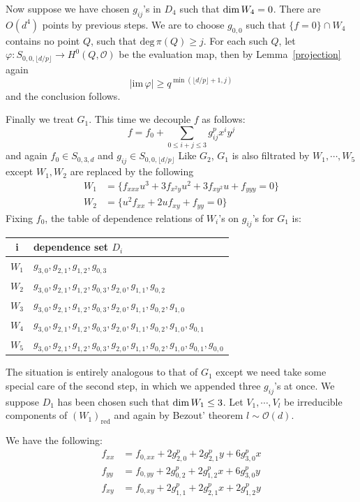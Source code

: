 \documentclass[12pt]{article}
\theoremstyle{plain}
\theoremstyle{definition}
\newcommand{\sO}{\mathcal{O}}
\renewcommand{\deg}{\mathrm{deg}\,}
\renewcommand\dim{{\rm dim\,}}
\newcommand{\<}{\langle}
\renewcommand{\>}{\rangle}
\newcommand{\fl}[1]{\lfloor #1 \rfloor}
\newcommand{\im}{\mathrm{im}\,}
\begin{document}
Now suppose we have chosen $g_{ij}$'s in $D_4$ such that $\dim W_4 = 0$. There are $O(d^4)$ points by previous steps. We are to choose $g_{0, 0}$ such that $\{f=0 \} \cap W_4$ contains no point $Q$, such that $\deg \pi({Q}) \ge j$. For each such $Q$, let $\varphi : S_{0, 0, \fl{d/p}} \to H^0(Q, \sO)$ be the evaluation map, then by Lemma~\ref{projection} again 
$$ |\im \varphi| \ge q^{\min(\fl{d/p} + 1, j)} $$
and the conclusion follows. 

Finally we treat $G_1$. This time we decouple $f$ as follows:
$$ f = f_0 + \sum_{0 \le i + j \le 3} g_{ij}^p x^i y^j $$
and again $f_0 \in S_{0, 3, d}$ and $g_{ij} \in S_{0, 0, \fl{d/p}}$
Like $G_2$, $G_1$ is also filtrated by $W_1, \cdots, W_5$ except $W_1, W_2$ are replaced by the following 
\begin{align*}
W_1 &= \{f_{xxx} u^3 + 3 f_{x^2 y} u^2 + 3 f_{x y^2} u + f_{yyy} = 0\}\\
W_2 &= \{u^2 f_{xx} + 2u f_{xy} + f_{yy} = 0\}
\end{align*}
Fixing $f_0$, the table of dependence relations of $W_i$'s on $g_{ij}$'s for $G_1$ is:
\begin{center}
\begin{tabular}{|c | l |}
\hline
i & dependence set $D_i$ \\ \hline
$W_1$ & $g_{3, 0}, g_{2, 1}, g_{1, 2}, g_{0, 3}$ \\ \hline
$W_2$ & $g_{3, 0}, g_{2, 1}, g_{1, 2}, g_{0, 3}, g_{2, 0}, g_{1, 1}, g_{0, 2}$ \\ \hline
$W_3$ & $g_{3, 0}, g_{2, 1}, g_{1, 2}, g_{0, 3}, g_{2, 0}, g_{1, 1}, g_{0, 2}, g_{1, 0}$ \\ \hline
$W_4$ & $g_{3, 0}, g_{2, 1}, g_{1, 2}, g_{0, 3}, g_{2, 0}, g_{1, 1}, g_{0, 2}, g_{1, 0}, g_{0, 1}$ \\ \hline
$W_5$ & $g_{3, 0}, g_{2, 1}, g_{1, 2}, g_{0, 3}, g_{2, 0}, g_{1, 1}, g_{0, 2}, g_{1, 0}, g_{0, 1}, g_{0, 0}$ \\ \hline
\end{tabular}
\end{center}
The situation is entirely analogous to that of $G_1$ except we need take some special care of the second step, in which we appended three $g_{ij}$'s at once. We suppose $D_1$ has been chosen such that $\dim W_1 \le 3$. Let $V_1, \cdots, V_l$ be irreducible components of $(W_1)_{\mathrm{red}}$ and again by Bezout' theorem $l \sim \sO(d)$. 

We have the following:
\begin{align*}
f_{xx} &= f_{0, xx} + 2 g_{2, 0}^p + 2g_{2, 1}^p y + 6 g_{3, 0}^p x \\
f_{yy} &= f_{0, yy} + 2 g_{0, 2}^p + 2g_{1, 2}^p x + 6 g_{3, 0}^p y \\
f_{xy} &= f_{0, xy} + 2 g_{1, 1}^p + 2g_{2, 1}^p x + 2 g_{1, 2}^p y
\end{align*}
\end{document}
